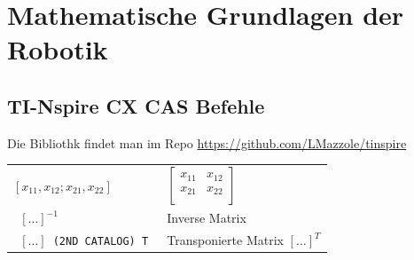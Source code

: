 \section{Mathematische Grundlagen der Robotik}

\subsection{TI-Nspire CX CAS Befehle}
Die Bibliothk findet man im Repo \href{LMazzole/tinspire}{https://github.com/LMazzole/tinspire}\newline
\begin{tabular}{p{5cm}p{10cm}}

\texttt{$[ x_{11} , x_{12} ; x_{21},x_{22}]$} &  $ \begin{bmatrix}
            	x_{11} & x_{12}\\
            	x_{21} & x_{22}\\
            \end{bmatrix} $ \\
\texttt{ $[ \ldots]^{-1} $} & Inverse Matrix\\
\texttt{ $[ \ldots] $ (2ND CATALOG) \small{T} } & Transponierte Matrix
$[\ldots]^{T}$\\

\end{tabular} \\
	
